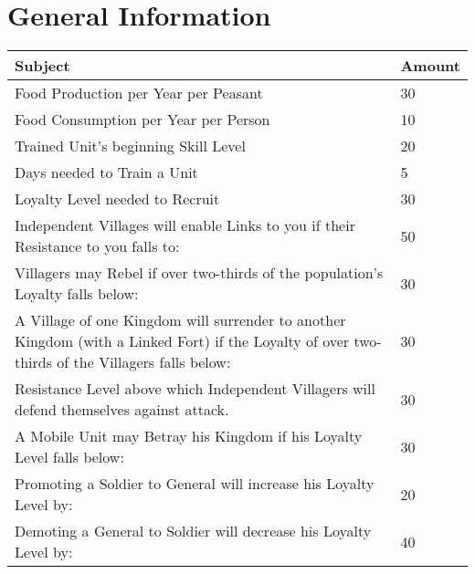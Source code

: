 \section{General Information}

\begin{center}
\begin{tabular}{ | p{2in} | p{2in} |}
	\hline
	Subject	& Amount \\ \hline
Food Production per Year per Peasant	& 30 \\ \hline
Food Consumption per Year per Person	& 10 \\ \hline
Trained Unit’s beginning Skill Level	& 20 \\ \hline
Days needed to Train a Unit	& 5 \\ \hline
Loyalty Level needed to Recruit	& 30 \\ \hline
Independent Villages will enable Links to you if their Resistance to you falls to:	& 50 \\ \hline
Villagers may Rebel if over two-thirds of the population’s Loyalty falls below:	& 30 \\ \hline
A Village of one Kingdom will surrender to another Kingdom (with a Linked Fort) if the Loyalty of over two-thirds of the Villagers falls below:	& 30 \\ \hline
Resistance Level above which Independent Villagers will defend themselves against attack.	& 30 \\ \hline
A Mobile Unit may Betray his Kingdom if his Loyalty Level falls below:	& 30 \\ \hline
Promoting a Soldier to General will increase his Loyalty Level by:	& 20 \\ \hline
Demoting a General to Soldier will decrease his Loyalty Level by:	& 40 \\ \hline
\end{tabular}
\end{center}